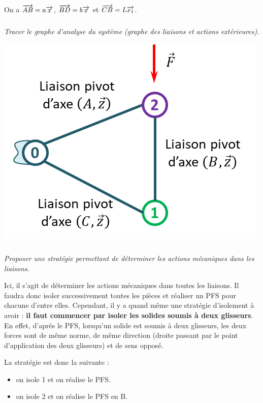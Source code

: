 \documentclass[10pt,fleqn]{article} %
\begin{document}
\begin{multicols}{2}
\begin{multicols}{2}
On a $\overrightarrow{AB}=a \overrightarrow{x}$,  $\overrightarrow{BD}=b \overrightarrow{x}$ et  $\overrightarrow{CB}=L \overrightarrow{x_1}$.
\fi

\subparagraph{}\textit{Tracer le graphe d'analyse du système (graphe des liaisons et actions extérieures).}
\ifprof
\begin{corrige}
\begin{center}
\includegraphics[width=\linewidth]{images/cor_01}
\end{center}

\end{corrige}
\else
\fi

\subparagraph{}\textit{Proposer une stratégie permettant de déterminer les actions mécaniques dans les liaisons.}
\ifprof
\begin{corrige}
Ici, il s'agit de déterminer les actions mécaniques dans toutes les liaisons. Il faudra donc isoler successivement toutes les pièces et réaliser un PFS pour chacune d'entre elles. Cependant, il y a quand même une stratégie d'isolement à avoir : \textbf{il faut commencer par isoler les solides soumis à deux glisseurs}. En effet, d'après le PFS, lorsqu'un solide est soumis à deux glisseurs, les deux forces sont de même norme, de même direction (droite passant par le point d'application des deux glisseurs) et de sens opposé. 

La stratégie est donc la suivante : 
\begin{itemize}
\item on isole 1 et on réalise le PFS. 
\item on isole 2 et on réalise le PFS en B. 
\end{itemize} 



\end{corrige}
\end{multicols}
\end{multicols}
\end{document}
